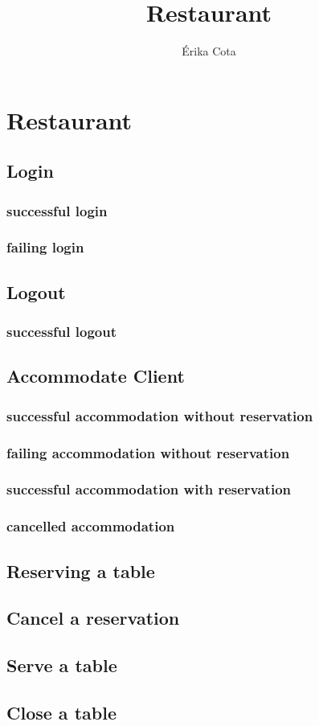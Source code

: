 \documentclass[a4paper,11pt,oneside]{book}
\author{Érika Cota}
\title{Restaurant}
\begin{document}
\maketitle
\pagestyle{plain}

\chapter*{Restaurant}

\section{Login}

\subsection{successful login}
\subsection{failing login}

\section{Logout}
\subsection{successful logout}

\section{Accommodate Client}

\subsection{successful accommodation without reservation}
\subsection{failing accommodation without reservation}
\subsection{successful accommodation with reservation}
\subsection{cancelled accommodation}

\section{Reserving a table}

\section{Cancel a reservation}

\section{Serve a table}

\section{Close a table}
\end{document}
